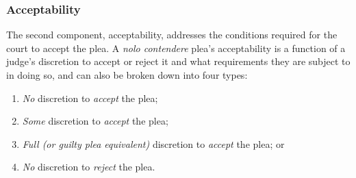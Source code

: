 \subsubsection{Acceptability}

The second component, acceptability, addresses the conditions required for the court to accept the plea. A \textit{nolo contendere} plea's acceptability is a function of a judge’s discretion to accept or reject it and what requirements they are subject to in doing so, and can also be broken down into four types:

\begin{enumerate}
\item \textit{No} discretion to \textit{accept} the plea;
\item \textit{Some} discretion to \textit{accept} the plea;
\item \textit{Full (or guilty plea equivalent)} discretion to \textit{accept} the plea; or
\item \textit{No} discretion to \textit{reject} the plea.%
\end{enumerate}

